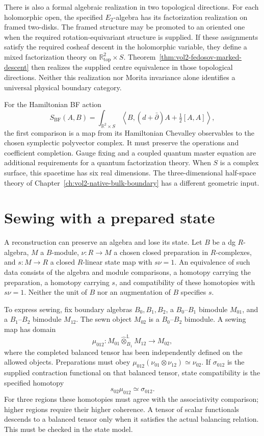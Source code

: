 There is also a formal algebraic realization in two
topological directions. For each holomorphic open, the
specified \(E_2\)-algebra has its factorization realization
on framed two-disks. The framed structure may be promoted
to an oriented one when the required rotation-equivariant
structure is supplied. If these assignments satisfy the
required cosheaf descent in the holomorphic variable, they
define a mixed factorization theory on
\(\mathbb R^2_{\mathrm{top}}\times S\).
Theorem~\ref{thm:vol2-fedosov-marked-descent} then realizes
the supplied centre equivalence in those topological
directions. Neither this realization nor Morita invariance
alone identifies a universal physical boundary category.

For the Hamiltonian BF action
\[
 S_{\mathrm{BF}}(A,B)=
 \int_{\mathbb R^2\times S}
 \left\langle B,(d+\bar\partial)A+\tfrac12[A,A]\right\rangle,
\]
the first comparison is a map from its Hamiltonian Chevalley
observables to the chosen symplectic polyvector complex.
It must preserve the operations and coefficient completion.
Gauge fixing and a coupled quantum master equation are
additional requirements for a quantum factorization theory.
When \(S\) is a complex surface, this spacetime has six real
dimensions. The three-dimensional half-space theory of
Chapter~\ref{ch:vol2-native-bulk-boundary} has a different
geometric input.

\section{Sewing with a prepared state}
\label{sec:vol2-marked-state-sewing}

A reconstruction can preserve an algebra and lose its state.
Let \(B\) be a dg \(R\)-algebra, \(M\) a \(B\)-module,
\(\nu:R\to M\) a chosen closed preparation in \(R\)-complexes,
and \(s:M\to R\) a closed \(R\)-linear state map with
\(s\nu=1\). An equivalence of such data consists of the
algebra and module comparisons, a homotopy carrying the
preparation, a homotopy carrying \(s\), and compatibility
of these homotopies with \(s\nu=1\).
Neither the unit of \(B\) nor an augmentation of \(B\)
specifies \(s\).

To express sewing, fix boundary algebras \(B_0,B_1,B_2\),
a \(B_0\)--\(B_1\) bimodule \(M_{01}\), and a
\(B_1\)--\(B_2\) bimodule \(M_{12}\). The sewn object
\(M_{02}\) is a \(B_0\)--\(B_2\) bimodule.
A sewing map has domain
\[
 \mu_{012}:
 M_{01}\widehat\otimes^{\mathbb L}_{B_1}M_{12}
 \longrightarrow M_{02},
\]
where the completed balanced tensor has been independently
defined on the allowed objects. Preparations must obey
\(\mu_{012}(\nu_{01}\otimes\nu_{12})\simeq\nu_{02}\).
If \(\sigma_{012}\) is the supplied contraction functional
on that balanced tensor, state compatibility is the
specified homotopy
\begin{equation}\label{eq:vol2-marked-sewing-state}
 s_{02}\mu_{012}\simeq\sigma_{012}.
\end{equation}
For three regions these homotopies must agree with the
associativity comparison; higher regions require their
higher coherence. A tensor of scalar functionals descends
to a balanced tensor only when it satisfies the actual
balancing relation. This must be checked in the state model.

